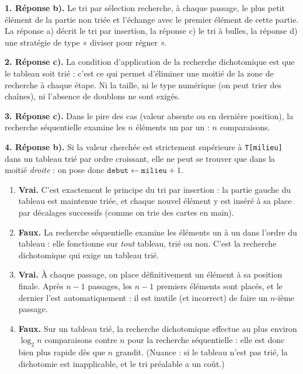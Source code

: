 \documentclass[11pt]{article}
\newcommand{\cle}[1]{{\popxbold\color{popdark}#1}}
\begin{document}
\begin{corrige}
\textbf{1. Réponse b).} Le tri par sélection recherche, à chaque passage, le \cle{plus petit élément} de la partie non triée et l'échange avec le premier élément de cette partie. La réponse a) décrit le tri par insertion, la réponse c) le tri à bulles, la réponse d) une stratégie de type « diviser pour régner ».

\textbf{2. Réponse c).} La condition d'application de la recherche dichotomique est que le tableau soit \cle{trié} : c'est ce qui permet d'éliminer une moitié de la zone de recherche à chaque étape. Ni la taille, ni le type numérique (on peut trier des chaînes), ni l'absence de doublons ne sont exigés.

\textbf{3. Réponse c).} Dans le pire des cas (valeur absente ou en dernière position), la recherche séquentielle examine les $n$ éléments un par un : $n$ comparaisons.

\textbf{4. Réponse b).} Si la valeur cherchée est strictement supérieure à \texttt{T[milieu]} dans un tableau trié par ordre croissant, elle ne peut se trouver que dans la moitié \emph{droite} : on pose donc $\texttt{debut} \leftarrow \texttt{milieu} + 1$.
\end{corrige}

\begin{corrige}
\begin{enumerate}
\item \textbf{Vrai.} C'est exactement le principe du tri par insertion : la partie gauche du tableau est maintenue triée, et chaque nouvel élément y est inséré à sa place par décalages successifs (comme on trie des cartes en main).
\item \textbf{Faux.} La recherche séquentielle examine les éléments un à un dans l'ordre du tableau : elle fonctionne sur \emph{tout} tableau, trié ou non. C'est la recherche dichotomique qui exige un tableau trié.
\item \textbf{Vrai.} À chaque passage, on place définitivement un élément à sa position finale. Après $n-1$ passages, les $n-1$ premiers éléments sont placés, et le dernier l'est automatiquement : il est inutile (et incorrect) de faire un $n$-ième passage.
\item \textbf{Faux.} Sur un tableau trié, la recherche dichotomique effectue au plus environ $\log_2 n$ comparaisons contre $n$ pour la recherche séquentielle : elle est donc bien plus rapide dès que $n$ grandit. (Nuance : si le tableau n'est pas trié, la dichotomie est inapplicable, et le tri préalable a un coût.)
\end{enumerate}
\end{corrige}
\end{document}
